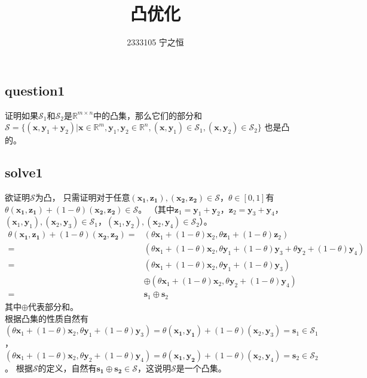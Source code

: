 \documentclass[12pt,a4paper]{ctexart}
\title{\heiti 凸优化}
\author{2333105 宁之恒}
\date{}
\begin{document}
\maketitle

\subsection*{question1}
证明如果$\mathcal{S}_1$和$\mathcal{S}_2$是$\mathbb{R}^{m \times n}$中的凸集，那么它们的部分和
$\mathcal{S}=\{(\boldsymbol{x},\boldsymbol{y}_1+\boldsymbol{y}_2)|\boldsymbol{x} \in \mathbb{R}^m,\boldsymbol{y}_1,\boldsymbol{y}_2 \in \mathbb{R}^n,(\boldsymbol{x},\boldsymbol{y}_1) \in \mathcal{S}_1,(\boldsymbol{x},\boldsymbol{y}_2)\in \mathcal{S}_2\}$
也是凸的。

\subsection*{solve1}
欲证明$\mathcal{S}$为凸，
只需证明对于任意$(\boldsymbol{x_1},\boldsymbol{z_1}),(\boldsymbol{x_2},\boldsymbol{z_2}) \in \mathcal{S}$，$\theta \in [0,1]$有$\theta(\boldsymbol{x_1},\boldsymbol{z_1})+(1-\theta)(\boldsymbol{x_2},\boldsymbol{z_2}) \in \mathcal{S}$。
（其中$\boldsymbol{z}_1=\boldsymbol{y}_1+\boldsymbol{y}_2$，$\boldsymbol{z}_2=\boldsymbol{y}_3+\boldsymbol{y}_4$，$
(\boldsymbol{x}_1,\boldsymbol{y}_1),(\boldsymbol{x}_2,\boldsymbol{y}_3) \in \mathcal{S}_1$，$(\boldsymbol{x}_1,\boldsymbol{y}_2),(\boldsymbol{x}_2,\boldsymbol{y}_4) \in \mathcal{S}_2$）。
\begin{align*}
\theta(\boldsymbol{x_1},\boldsymbol{z_1})+(1-\theta)(\boldsymbol{x_2},\boldsymbol{z_2})
=&(\theta \boldsymbol{x}_1+(1-\theta)\boldsymbol{x}_2,\theta \boldsymbol{z}_1+(1-\theta)\boldsymbol{z}_2)\\
=&(\theta \boldsymbol{x}_1+(1-\theta)\boldsymbol{x}_2,\theta\boldsymbol{y}_1+(1-\theta)\boldsymbol{y}_3+\theta \boldsymbol{y}_2+(1-\theta)\boldsymbol{y}_4)\\
=&(\theta \boldsymbol{x}_1+(1-\theta)\boldsymbol{x}_2,\theta\boldsymbol{y}_1+(1-\theta)\boldsymbol{y}_3)\\
&\oplus(\theta \boldsymbol{x}_1+(1-\theta)\boldsymbol{x}_2,\theta \boldsymbol{y}_2+(1-\theta)\boldsymbol{y}_4)\\
=&\boldsymbol{s}_1\oplus\boldsymbol{s}_2
\end{align*}
其中$\oplus$代表部分和。\\
根据凸集的性质自然有
$(\theta \boldsymbol{x}_1+(1-\theta)\boldsymbol{x}_2,\theta\boldsymbol{y}_1+(1-\theta)\boldsymbol{y}_3)=\theta(\boldsymbol{x_1},\boldsymbol{y_1})+(1-\theta)(\boldsymbol{x}_2,\boldsymbol{y}_3)=\boldsymbol{s}_1 \in \mathcal{S}_1$，
$(\theta \boldsymbol{x}_1+(1-\theta)\boldsymbol{x}_2,\theta\boldsymbol{y}_2+(1-\theta)\boldsymbol{y}_4)=\theta(\boldsymbol{x_1},\boldsymbol{y_2})+(1-\theta)(\boldsymbol{x}_2,\boldsymbol{y}_4)=\boldsymbol{s}_2 \in \mathcal{S}_2$。
根据$\mathcal{S}$的定义，自然有$\boldsymbol{s_1}\oplus\boldsymbol{s_2} \in \mathcal{S}$，这说明$\mathcal{S}$是一个凸集。
\end{document}
